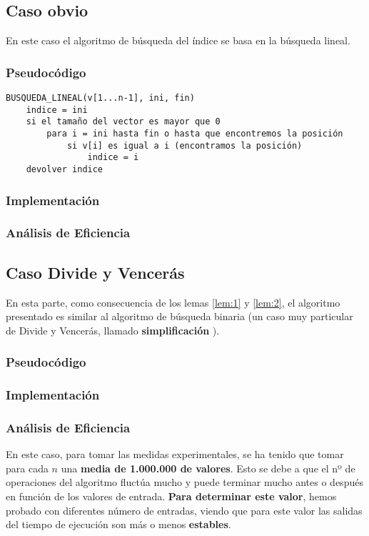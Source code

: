 \subsection{Caso obvio}

En este caso el algoritmo de búsqueda del índice se basa en la búsqueda lineal. 
\subsubsection{Pseudocódigo}

\begin{lstlisting}
BUSQUEDA_LINEAL(v[1...n-1], ini, fin)
    indice = ini
    si el tamaño del vector es mayor que 0
        para i = ini hasta fin o hasta que encontremos la posición
            si v[i] es igual a i (encontramos la posición)
                indice = i
    devolver indice
\end{lstlisting}

\subsubsection{Implementación}
\subsubsection{Análisis de Eficiencia}

% 

\subsection{Caso Divide y Vencerás}

En esta parte, como consecuencia de los lemas \ref{lem:1} y \ref{lem:2}, el algoritmo presentado es similar 
al algoritmo de búsqueda binaria (un caso muy particular de Divide y Vencerás, 
llamado \textbf{simplificación} \cite{Verdegay2017}).

\subsubsection{Pseudocódigo}
\subsubsection{Implementación}
\subsubsection{Análisis de Eficiencia}
En este caso, para tomar las medidas experimentales, se ha tenido que tomar para cada $n$ una \textbf{media de 1.000.000
de valores}. Esto se debe a que el nº de operaciones del algoritmo fluctúa mucho y puede terminar mucho antes o después en función
de los valores de entrada. \textbf{Para determinar este valor}, hemos probado con diferentes número de entradas, 
viendo que para este valor las salidas del tiempo de ejecución son más o menos \textbf{estables}. 

\begin{lstlisting}
    
\end{lstlisting}